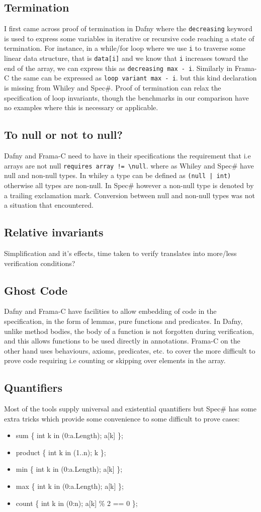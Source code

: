 \documentclass[10pt]{article} %
\begin{document}
\subsection{Termination}
I first came across proof of termination in Dafny where the \verb/decreasing/ keyword is used to express some variables in iterative or recursive code reaching a state of termination. For instance, in a while/for loop where we use \verb/i/ to traverse some linear data structure, that is \verb/data[i]/ and we know that \verb/i/ increases toward the end of the array, we can express this as \verb/decreasing max - i/. Similarly in Frama-C the same can be expressed as \verb/loop variant max - i/. but this kind declaration is missing from Whiley and Spec\#. Proof of termination can relax the specification of loop invariants, though the benchmarks in our comparison have no examples where this is necessary or applicable.
\subsection{To null or not to null?}
Dafny and Frama-C need to have in their specifications the requirement that i.e arrays are not null \verb/requires array != \null/. where as Whiley and Spec\# have null and non-null types. In whiley a type can be defined as \verb/(null | int)/ otherwise all types are non-null. In Spec\# however a non-null type is denoted by a trailing exclamation mark. Conversion between null and non-null types was not a situation that encountered.
\subsection{Relative invariants} 
Simplification and it's effects, time taken to verify translates into more/less verification conditions?
\subsection{Ghost Code}
Dafny and Frama-C have facilities to allow embedding of code in the specification, in the form of  lemmas, pure functions and predicates. In Dafny, unlike method bodies, the body of a function is not forgotten during verification, and this allows functions to be used directly in annotations. Frama-C on the other hand uses behaviours, axioms, predicates, etc. to cover the more difficult to prove code requiring i.e counting or skipping over elements in the array.
\subsection{Quantifiers}
Most of the tools supply universal and existential quantifiers but Spec\# has some extra tricks which provide some convenience to some difficult to prove cases:
\begin{itemize}
\item sum \{ int k in (0:a.Length); a[k] \};
\item product \{ int k in (1..n); k \};
\item min \{ int k in (0:a.Length); a[k] \};
\item max \{ int k in (0:a.Length); a[k] \};
\item count \{ int k in (0:n); a[k] \% 2 == 0 \};
\end{itemize}
\end{document}
